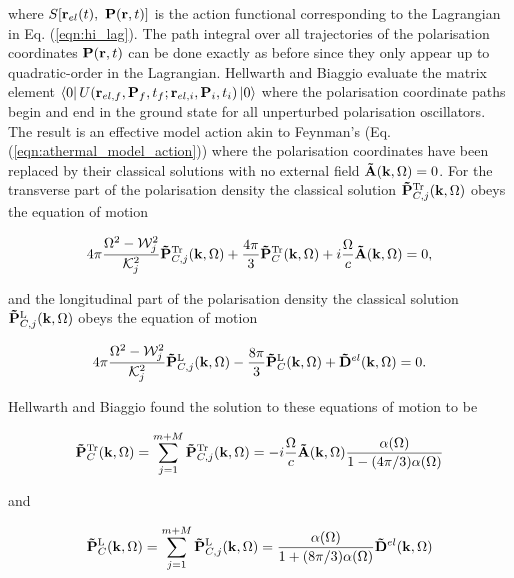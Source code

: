 where $S[\vb{r}_{el}(t),\ \vb{P}(\vb{r}, t)]$ is the action functional corresponding to the Lagrangian in Eq. (\ref{eqn:hi_lag}). The path integral over all trajectories of the polarisation coordinates $\vb{P}(\vb{r}, t)$ can be done exactly as before since they only appear up to quadratic-order in the Lagrangian. Hellwarth and Biaggio evaluate the matrix element $\bra{0} U(\vb{r}_{el, f}, \vb{P}_f, t_f; \vb{r}_{el, i}, \vb{P}_i, t_i) \ket{0}$ where the polarisation coordinate paths begin and end in the ground state for all unperturbed polarisation oscillators. The result is an effective model action akin to Feynman's (Eq. (\ref{eqn:athermal_model_action})) where the polarisation coordinates have been replaced by their classical solutions with no external field $\vb{\Tilde{A}}(\vb{k}, \Omega) = 0$. For the transverse part of the polarisation density the classical solution $\vb{\Tilde{P}}^{\text{Tr}}_{C, j}(\vb{k}, \Omega)$ obeys the equation of motion

\begin{equation}
    4\pi \frac{\Omega^2 - \mathcal{W}_j^2}{\mathcal{K}_j^2} \vb{\Tilde{P}}^{\text{Tr}}_{C, j}(\vb{k}, \Omega) + \frac{4\pi}{3} \vb{\Tilde{P}}^{\text{Tr}}_{C}(\vb{k}, \Omega) + i \frac{\Omega}{c} \vb{\Tilde{A}}(\vb{k}, \Omega) = 0,
\end{equation}

and the longitudinal part of the polarisation density the classical solution $\vb{\Tilde{P}}^{\text{L}}_{C, j}(\vb{k}, \Omega)$ obeys the equation of motion

\begin{equation}
    4\pi \frac{\Omega^2 - \mathcal{W}_j^2}{\mathcal{K}_j^2} \vb{\Tilde{P}}^{\text{L}}_{C, j}(\vb{k}, \Omega) - \frac{8\pi}{3} \vb{\Tilde{P}}^{\text{L}}_{C}(\vb{k}, \Omega) + \vb{\Tilde{D}}^{el}(\vb{k}, \Omega) = 0.
\end{equation}

Hellwarth and Biaggio found the solution to these equations of motion to be

\begin{equation} \label{eqn:tr_sol}
    \vb{\Tilde{P}}^{\text{Tr}}_{C}(\vb{k}, \Omega) = \sum_{j = 1}^{m+M} \vb{\Tilde{P}}^{\text{Tr}}_{C, j}(\vb{k}, \Omega) = -i \frac{\Omega}{c} \vb{\Tilde{A}}(\vb{k}, \Omega) \frac{\alpha(\Omega)}{1 - (4\pi / 3) \alpha(\Omega)}
\end{equation}

and

\begin{equation}
    \vb{\Tilde{P}}^{\text{L}}_{C}(\vb{k}, \Omega) = \sum_{j = 1}^{m+M} \vb{\Tilde{P}}^{\text{L}}_{C, j}(\vb{k}, \Omega) = \frac{\alpha(\Omega)}{1 + (8\pi / 3) \alpha(\Omega)} \vb{\Tilde{D}}^{el}(\vb{k}, \Omega)
\end{equation}

